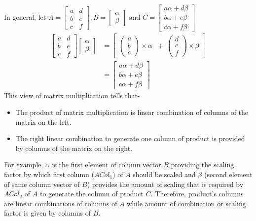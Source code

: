 \documentclass{article}
\begin{document}
In general, let \(A = \begin{bmatrix}
        a & d \\
        b & e \\
        c & f
    \end{bmatrix}, B= \begin{bmatrix}
        \alpha \\
        \beta  \end{bmatrix}\text{ and }C = \begin{bmatrix}
    a\alpha + d\beta \\
    b\alpha + e\beta \\
    c\alpha + f\beta
    \end{bmatrix}\)\\
\begin{align}
    \begin{bmatrix}
        a & d \\
        b & e \\
        c & f
    \end{bmatrix} \begin{bmatrix}
        \alpha \\
        \beta
    \end{bmatrix} &= \begin{bmatrix}
        \begin{pmatrix}
            a\\
            b\\
            c
        \end{pmatrix}  \times  \alpha & + ~~\begin{pmatrix}
            d\\
            e\\
            f
        \end{pmatrix}  \times  \beta
    \end{bmatrix} \nonumber\\
    &= \begin{bmatrix}
    a\alpha + d\beta \\
    b\alpha + e\beta \\
    c\alpha + f\beta
    \end{bmatrix} \nonumber
\end{align} 
This view of matrix multiplication tells that-
\begin{itemize}
    \item The product of matrix multiplication is linear combination of columns of the matrix on the left.
    \item The right linear combination to generate one column of product is provided by columns of the matrix on the right.
\end{itemize}
For example, $\alpha$ is the first element of column vector $B$ providing the scaling factor by which first column ($ACol_1$) of $A$ should be scaled and $\beta$ (second element of same column vector of $B$) provides the amount of scaling that is required by $ACol_2$ of $A$ to generate the column of product $C$. Therefore, product's columns are linear combinations of columns of $A$ while amount of combination or scaling factor is given by columns of $B$.
\end{document}
